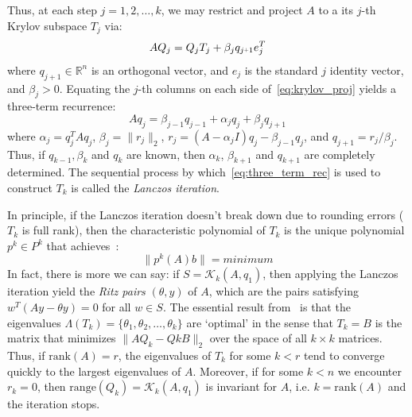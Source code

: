 \documentclass[10pt]{article}
\newcommand{\+}{%
	\raisebox{0.18ex}{\scaleobj{0.55}{+}}
}
\begin{document}
Thus, at each step $j = 1, 2, \dots, k$, we may restrict and project $A$ to a its $j$-th Krylov subspace $T_j$ via: 
\begin{equation}\label{eq:krylov_proj}
	A Q_j = Q_j T_j + \beta_j q_{j\+1} e_{j}^T
\end{equation}
where $q_{j+1} \in \mathbb{R}^n$ is an orthogonal vector, and $e_{j}$ is the standard $j$ identity vector, and $\beta_j > 0$.
Equating the $j$-th columns on each side of~\eqref{eq:krylov_proj} yields a three-term recurrence: 
\begin{equation}\label{eq:three_term_rec}
	A q_j = \beta_{j-1} q_{j-1} + \alpha_j q_j + \beta_{j} q_{j+1}
\end{equation}
where $\alpha_j = q_j^T A q_j$, $\beta_j = \lVert r_j \rVert_2$, $r_j = (A - \alpha_j I)q_j - \beta_{j-1} q_j$, and $q_{j+1} = r_j / \beta_j$. Thus, if $q_{k-1}, \beta_k$ and $q_k$ are known, then $\alpha_k$, $\beta_{k+1}$ and $q_{k+1}$ are completely determined.
The sequential process by which~\eqref{eq:three_term_rec} is used to construct $T_k$ is called the \emph{Lanczos iteration}. 

In principle, if the Lanczos iteration doesn't break down due to rounding errors ($T_k$ is full rank), then the characteristic polynomial of $T_k$ is the unique polynomial $p^k \in P^k$ that achieves~\cite{}:
\begin{equation}
	\lVert p^k(A)b \rVert = {minimum}
\end{equation}
In fact, there is more we can say: if $S = \mathcal{K}_k(A, q_1)$, then applying the Lanczos iteration yield the \emph{Ritz pairs} $(\theta, y)$ of $A$, which are the pairs satisfying $w^T (Ay - \theta y) = 0$ for all $w \in S$.
The essential result from~\cite{} is that the eigenvalues $\Lambda(T_k) = \{\theta_1, \theta_2, \dots, \theta_k \}$ are `optimal' in the sense that $T_k = B$ is the matrix that minimizes  $\lVert A Q_k - Qk B \rVert_2$ over the space of all $k \times k$ matrices. Thus, if $\mathrm{rank}(A) = r$, the eigenvalues of $T_k$ for some $k < r$ tend to converge quickly to the largest eigenvalues of $A$. Moreover, if for some $k < n$ we encounter $r_k = 0$, then $\mathrm{range}(Q_k) = \mathcal{K}_k(A, q_1)$ is invariant for $A$, i.e. $k = \mathrm{rank}(A)$ and the iteration stops. 
\end{document}
